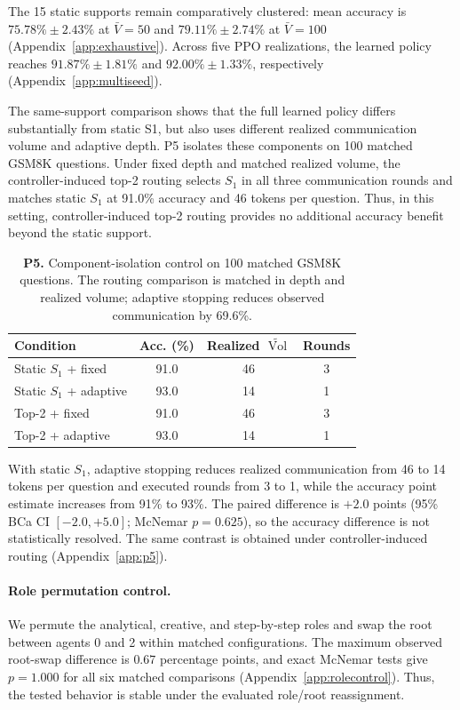 \documentclass[11pt]{article}
\newcommand{\Vol}{\operatorname{Vol}}
\newcommand{\Volt}{\widetilde{\Vol}}
\begin{document}
The 15 static supports remain comparatively clustered: mean accuracy is
$75.78\%\pm2.43\%$ at $\bar V=50$ and $79.11\%\pm2.74\%$ at $\bar V=100$
(Appendix~\ref{app:exhaustive}). Across five PPO realizations, the learned policy
reaches $91.87\%\pm1.81\%$ and $92.00\%\pm1.33\%$, respectively
(Appendix~\ref{app:multiseed}).

The same-support comparison shows that the full learned policy differs
substantially from static S1, but also uses different realized communication
volume and adaptive depth. P5 isolates these components on 100 matched GSM8K
questions. Under fixed depth and matched realized volume, the controller-induced
top-2 routing selects $S_1$ in all three communication rounds and matches static
$S_1$ at 91.0\% accuracy and 46 tokens per question. Thus, in this setting,
controller-induced top-2 routing provides no additional accuracy benefit beyond
the static support.

\begin{table}[t]
\centering
\small
\setlength{\tabcolsep}{4pt}
\begin{tabular}{lccc}
\toprule
Condition & Acc. (\%) & Realized $\Volt$ & Rounds \\
\midrule
Static $S_1$ + fixed & 91.0 & 46 & 3 \\
Static $S_1$ + adaptive & 93.0 & 14 & 1 \\
Top-2 + fixed & 91.0 & 46 & 3 \\
Top-2 + adaptive & 93.0 & 14 & 1 \\
\bottomrule
\end{tabular}
\caption{\textbf{P5.} Component-isolation control on 100 matched GSM8K
questions. The routing comparison is matched in depth and realized volume;
adaptive stopping reduces observed communication by 69.6\%.}
\label{tab:p5}
\end{table}

With static $S_1$, adaptive stopping reduces realized communication from 46 to
14 tokens per question and executed rounds from 3 to 1, while the accuracy
point estimate increases from 91\% to 93\%. The paired difference is $+2.0$
points (95\% BCa CI $[-2.0,+5.0]$; McNemar $p=0.625$), so the accuracy
difference is not statistically resolved. The same contrast is obtained under
controller-induced routing (Appendix~\ref{app:p5}).

\paragraph{Role permutation control.}
We permute the analytical, creative, and step-by-step roles and swap the root
between agents 0 and 2 within matched configurations. The maximum observed
root-swap difference is $0.67$ percentage points, and exact McNemar tests give
$p=1.000$ for all six matched comparisons
(Appendix~\ref{app:rolecontrol}). Thus, the tested behavior is stable under the
evaluated role/root reassignment.
\end{document}
